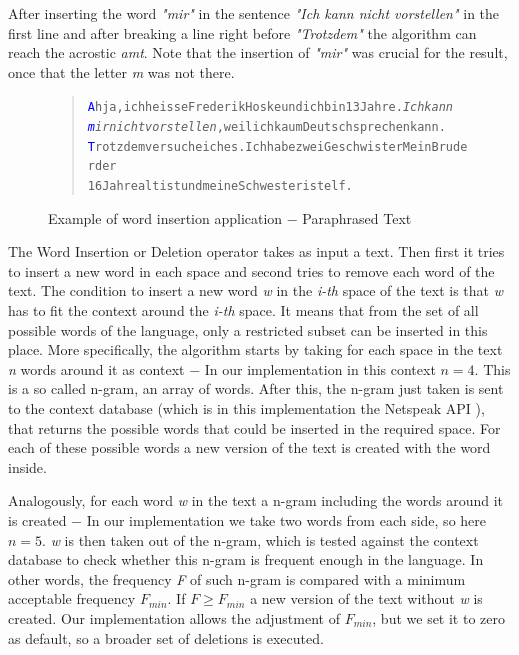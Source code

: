 \documentclass[11pt]{reportAlternative}
\begin{document}
After inserting the word \emph{"mir"} in the sentence \emph{"Ich kann nicht vorstellen"} in the first line and after breaking a line right before \emph{"Trotzdem"} the algorithm can reach the acrostic \emph{amt}. Note that the insertion of \emph{"mir"} was crucial for the result, once that the letter \emph{m} was not there.

\begin{figure}[H]
\begin{quote}
\begin{alltt}
\textcolor{Blue}{A}h ja, ich heisse Frederik Hoske und ich bin 13 Jahre. \textit{Ich kann
\textcolor{Blue}{m}ir nicht vorstellen}, weil ich kaum Deutsch sprechen kann.
\textcolor{Blue}{T}rotzdem versuche ich es. Ich habe zwei Geschwister Mein Bruder der
16 Jahre alt ist und meine Schwester ist elf.
\end{alltt}
\end{quote}
\caption{Example of word insertion application $-$ Paraphrased Text}
\end{figure}

The Word Insertion or Deletion operator takes as input a text. Then first it tries to insert a new word in each space and second tries to remove each word of the text. The condition to insert a new word \emph{w} in the \emph{i-th} space of the text is that \emph{w} has to fit the context around the \emph{i-th} space. It means that from the set of all possible words of the language, only a restricted subset can be inserted in this place. More specifically, the algorithm starts by taking for each space in the text \emph{n} words around it as context $-$ In our implementation in this context $n = 4$. This is a so called n-gram, an array of words. After this, the n-gram just taken is sent to the context database (which is in this implementation the Netspeak API \cite{Netspeak}), that returns the possible words that could be inserted in the required space. For each of these possible words a new version of the text is created with the word inside. \par

Analogously, for each word \emph{w} in the text a n-gram including the words around it is created $-$ In our implementation we take two words from each side, so here $n=5$. \emph{w} is then taken out of the n-gram, which is tested against the context database to check whether this n-gram is frequent enough in the language. In other words, the frequency \emph{F} of such n-gram is compared with a minimum acceptable frequency $F_{min}$. If $F \ge F_{min}$ a new version of the text without \emph{w} is created. Our implementation allows the adjustment of $F_{min}$, but we set it to zero as default, so a broader set of deletions is executed. \par
\end{document}
